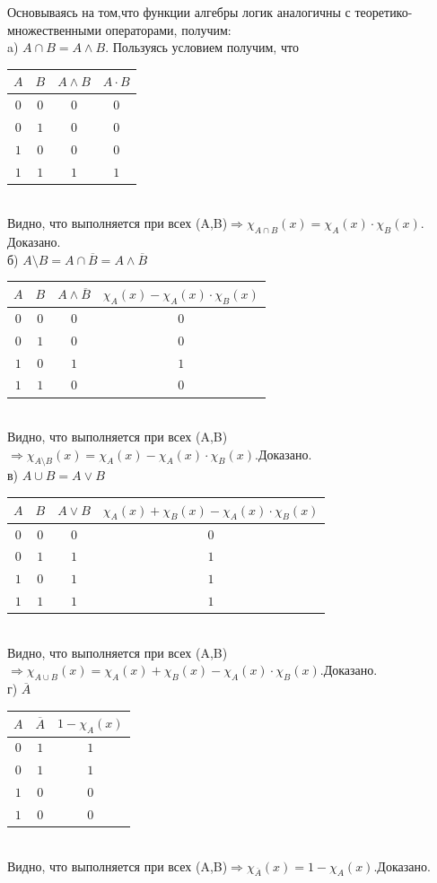 \documentclass[a4paper,14pt]{article} %
\begin{document}
Основываясь на том,что функции алгебры логик аналогичны с теоретико-множественными операторами, получим:\\
a) $A \cap B = A \wedge B.$ Пользуясь условием получим, что\\
\begin{tabular}{ | c | c | c | c |}
\hline
$A$ & $B$ & $A\wedge B$ & $A \cdot B$\\ \hline
$0$ & $0$ & $0$ & $0$\\
$0$ & $1$ & $0$ & $0$\\
$1$ & $0$ & $0$ & $0$\\
$1$ & $1$ & $1$ & $1$\\
\hline 
\end{tabular}\\
Видно, что выполняется при всех (A,B)$ \Rightarrow \chi_{A\cap B}(x) = \chi_{A}(x) \cdot \chi_{B}(x)$. Доказано.\\
б) $A \setminus B = A \cap \overline{B} = A \wedge \overline{B}$\\
\begin{tabular}{ | c | c | c | c |}
\hline
$A$ & $B$ & $ A \wedge \overline{B}$ & $\chi_{A}(x) - \chi_{A}(x) \cdot \chi_{B}(x)$\\ \hline
$0$ & $0$ & $0$ & $0$\\
$0$ & $1$ & $0$ & $0$\\
$1$ & $0$ & $1$ & $1$\\
$1$ & $1$ & $0$ & $0$\\
\hline 
\end{tabular}\\
Видно, что выполняется при всех (A,B)$ \Rightarrow \chi_{A\setminus B}(x) = \chi_{A}(x) - \chi_{A}(x) \cdot \chi_{B}(x).$Доказано.\\
в) $A \cup B = A \vee B$\\
\begin{tabular}{ | c | c | c | c |}
\hline
$A$ & $B$ & $A \vee B$ & $\chi_A(x) + \chi_{B}(x) - \chi_{A}(x)\cdot \chi_{B} (x)$\\ \hline
$0$ & $0$ & $0$ & $0$\\
$0$ & $1$ & $1$ & $1$\\
$1$ & $0$ & $1$ & $1$\\
$1$ & $1$ & $1$ & $1$\\
\hline 
\end{tabular}\\
Видно, что выполняется при всех (A,B)$ \Rightarrow \chi_{A\cup B}(x) = \chi_A(x) + \chi_{B}(x) - \chi_{A}(x)\cdot \chi_{B} (x).$Доказано.\\
г) $\overline{A}$\\
\begin{tabular}{ | c | c | c |}
\hline
$A$ & $\overline{A}$ & $1 - \chi_{A}(x)$\\ \hline
$0$ & $1$ & $1$\\
$0$ & $1$ & $1$\\
$1$ & $0$ & $0$\\
$1$ & $0$ & $0$\\
\hline 
\end{tabular}\\
Видно, что выполняется при всех (A,B)$ \Rightarrow \chi_{\overline{A}}(x) = 1 - \chi_{A}(x).$Доказано.
\end{document}
